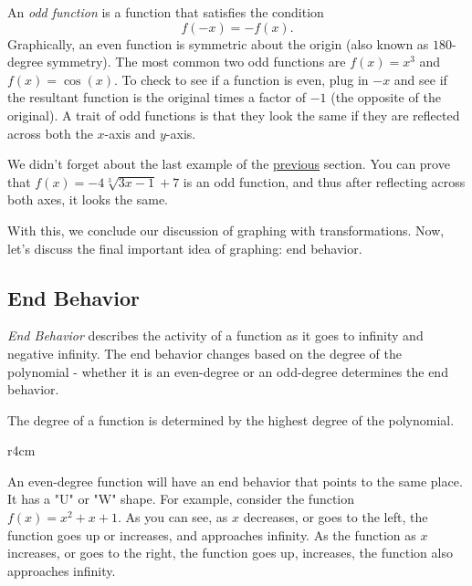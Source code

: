 \documentclass[lang=en,11pt]{elegantbook}
\begin{document}
An \textit{odd function} is a function that satisfies the condition $$f(-x)=-f(x).$$  Graphically, an even function is symmetric about the origin (also known as $180$-degree symmetry).  The most common two odd functions are $f(x)=x^3$ and $f(x)=\cos(x)$.  To check to see if a function is even, plug in $-x$ and see if the resultant function is the original times a factor of $-1$ (the opposite of the original).  A trait of odd functions is that they look the same if they are reflected across both the $x$-axis and $y$-axis.

We didn't forget about the last example of the \hyperlink{section.2.4.1}{previous} section.  You can prove that $f(x)=-4\sqrt[3]{3x-1}+7$ is an odd function, and thus after reflecting across both axes, it looks the same.

With this, we conclude our discussion of graphing with transformations.  Now, let's discuss the final important idea of graphing: end behavior.
\subsection{End Behavior}
\noindent \textit{End Behavior} describes the activity of a function as it goes to infinity and negative infinity.  The end behavior changes based on the degree of the polynomial - whether it is an even-degree or an odd-degree determines the end behavior.

\begin{remark}
  The degree of a function is determined by the highest degree of the polynomial.
\end{remark}

\begin{wrapfigure}{r}{4cm}
    \centering
\end{wrapfigure}
An even-degree function will have an end behavior that points to the same place.  It has a "U" or "W" shape.  For example, consider the function $f(x)=x^2+x+1$.  As you can see, as $x$ decreases, or goes to the left, the function goes up or increases, and approaches infinity.  As the function as $x$ increases, or goes to the right, the function goes up, increases, the function also approaches infinity.
\end{document}
